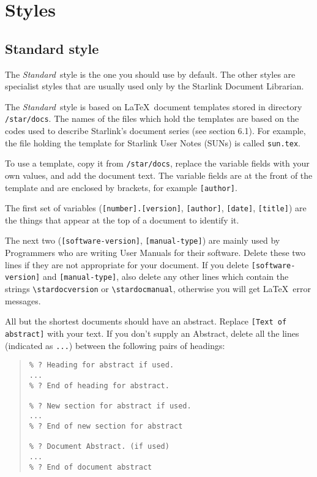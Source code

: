 \section{\label{styles}Styles}

\subsection{\label{standard_style}Standard style}

The {\em Standard}\, style is the one you should use by default.
The other styles are specialist styles that are usually used only by the
Starlink Document Librarian.

The {\em Standard}\, style is based on \LaTeX\ document templates stored in
directory {\tt /star/docs}.
The names of the files which hold the templates are based on the codes
used to describe Starlink's document series (see
 section 6.1).
For example, the file holding the template for Starlink User Notes (SUNs)
is called {\tt sun.tex}.

To use a template, copy it from {\tt /star/docs}, replace the variable fields
with your own values, and add the document text.
The variable fields are at the front of the template and are enclosed by
brackets, for example {\tt [author]}.

The first set of variables ({\tt [number].[version]}, {\tt [author]},
{\tt [date]}, {\tt [title]}) are the things that appear at the top of a
document to identify it.

The next two ({\tt [software-version]}, {\tt [manual-type]}) are mainly used
by Programmers who are writing User Manuals for their software.
Delete these two lines if they are not appropriate for your document.
If you delete {\tt [software-version]} and {\tt [manual-type]},
also delete any other lines which contain the strings
\verb+\stardocversion+ or \verb+\stardocmanual+, otherwise you will get
\LaTeX\ error messages.

All but the shortest documents should have an abstract.
Replace {\tt [Text of abstract]} with your text.
If you don't supply an Abstract, delete all the lines (indicated as
{\tt ...}) between the following pairs of headings:
\begin{quote}
\begin{verbatim}
% ? Heading for abstract if used.
...
% ? End of heading for abstract.

% ? New section for abstract if used.
...
% ? End of new section for abstract

% ? Document Abstract. (if used)
...
% ? End of document abstract
\end{verbatim}
\end{quote}

